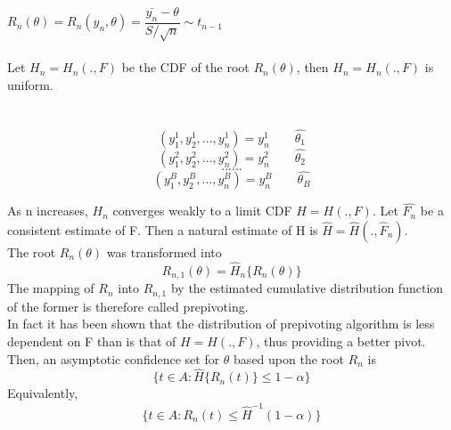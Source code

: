 \documentclass[a4paper,11pt]{article}
\begin{document}
\begin{enumerate}
\begin{enumerate}
  $ R_n (\theta)= R_n (y_n, \theta ) = \dfrac{\bar{y_n}-\theta}{S/\sqrt{n}} \sim t_{n-1}  $ \\  \\
         
  Let $ H_n = H_n (., F ) $ be the CDF of the root $ R_n (\theta) $, then $ H_n = H_n (., F ) $ is uniform. \\ \\ \\
  
   $$ (y_1^1, y_2^1, ..., y_n^1 )=y_n^1  \qquad \hat{\theta_1} $$
   $$ (y_1^2, y_2^2, ..., y_n^2 )=y_n^2 \qquad \hat{\theta_2} $$
   $$  ...... $$
   $$ (y_1^B, y_2^B, ..., y_n^B )=y_n^B \qquad \hat{\theta_B} $$

   
  As n increases, $ H_n $ converges weakly to a limit CDF $ H=H(., F) $. 
  Let $ \hat{F_n} $ be a consistent estimate of F. Then a natural estimate of H is $ \hat{H} = \hat{H}(., \hat{F}_n ) $. \\  
  The root $ R_n(\theta)$ was transformed into $$ R_{n,1}(\theta) = \hat{H}_n \{ R_n(\theta) \}  $$ 
  The mapping of $ R_n $ into $ R_{n,1} $ by the estimated cumulative distribution function of the former is therefore called prepivoting. \\
  In fact it has been shown that the distribution of prepivoting algorithm is less dependent on F than is that of $ H=H(., F) $, thus providing a better pivot. \\
  Then, an asymptotic confidence set for $ \theta $ based upon the root $ R_n $ is $$ \{ t \in A : \hat{ H } \{R_n(t) \} \le 1-\alpha \} $$ Equivalently, 
  $$ \{ t \in A : R_n(t)  \le \hat{ H }^{-1} (1-\alpha) \} $$
  \end{enumerate}
  

\end{enumerate}
\end{document}

